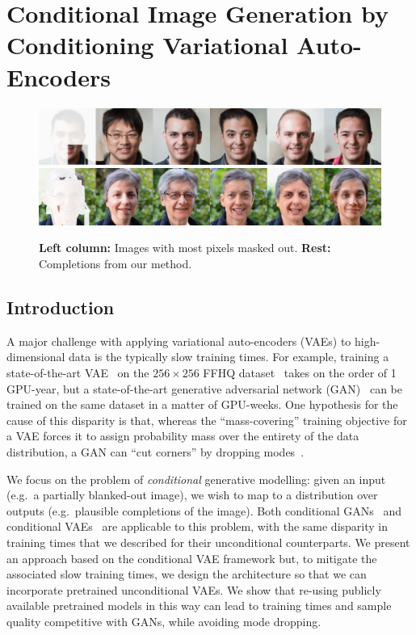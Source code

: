 \chapter{Conditional Image Generation by Conditioning Variational Auto-Encoders}
\label{ch:conditional_image_generation_by_conditioning_variational_auto-encoders}




\begin{figure}[b]
  \centering
  \includegraphics[width=\textwidth]{figs/cigcvae/qual/0_0_patches-4.png}
  \includegraphics[width=\textwidth]{figs/cigcvae/qual/59_2_3_modddd.png}
  \caption{\textbf{Left column:} Images with most pixels masked out.
    \textbf{Rest:} Completions from our method.
  }
  \label{fig:headline}
\end{figure}


\section{Introduction}
A major challenge with applying variational auto-encoders (VAEs) to
high-dimensional data is the typically slow training times. For example,
training a state-of-the-art VAE~\citep{vahdat2020nvae,child2020very} on the
$256\times256$ FFHQ dataset~\citep{karras2019style} takes on the order of 1
GPU-year, but a state-of-the-art generative adversarial network
(GAN)~\citep{lin2021anycost,karras2020analyzing} can be trained on the same
dataset in a matter of GPU-weeks. One hypothesis for the cause of this disparity
is that, whereas the ``mass-covering'' training objective for a VAE forces it to
assign probability mass over the entirety of the data distribution, a GAN can
``cut corners'' by dropping modes~\citep{arora2017gans,arora2017generalization}.

We focus on the problem of \textit{conditional} generative modelling: given an
input (e.g.~a partially blanked-out image), we wish to map to a distribution
over outputs (e.g.~plausible completions of the image). Both conditional
GANs~\citep{zheng2019pluralistic,zhao2021large} and conditional
VAEs~\citep{sohn2015learning,ivanov2018variational} are applicable to this
problem, with the same disparity in training times that we described for their
unconditional counterparts. We present an approach based on the conditional VAE
framework but, to mitigate the associated slow training times, we design the
architecture so that we can incorporate pretrained unconditional VAEs. We show
that re-using publicly available pretrained models in this way can lead to
training times and sample quality competitive with GANs, while avoiding mode
dropping.


